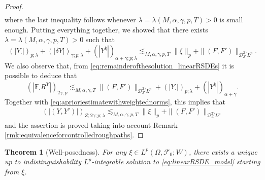 \documentclass[11pt,a4paper]{article}
\newcommand{\E}{\mathbb{E}}
\theoremstyle{plain}
\newtheorem{thm}[defn]{Theorem}
\begin{document}
\begin{proof}
\begin{equation}
\begin{aligned}
       \end{aligned}
   \end{equation}    where the last inequality follows whenever $\lambda=\lambda(M,\alpha,\gamma,p,T)>0$ is small enough.
   Putting everything together, we showed that there exists $\lambda=\lambda(M,\alpha,\gamma,p,T)>0$ such that \begin{equation} \label{eq:aprioriestimatewithweightednorms}
       (|Y_\cdot|)_{p;\lambda} + (|\delta{Y}|)_{\gamma;p;\lambda} + (|Y^\natural|)_{\alpha+\gamma;p;\lambda} \lesssim_{M,\alpha,\gamma,p,T} \|\xi\|_p + \|(F,F')\|_{\mathscr{D}^{2\gamma}_ZL^{p}}.
   \end{equation}
   We also observe that, from \eqref{eq:remainderofthesolution_linearRSDEs} it is possible to deduce that \begin{equation} \label{eq:weightednormoftheremainderofY}
       (|\E_\cdot R^Y|)_{2\gamma;p} \lesssim_{M,\alpha,\gamma,T} \|(F,F')\|_{\mathscr{D}_Z^{2\gamma}L^p} + (|Y_\cdot|)_{p;\lambda} + (|Y^\natural|)_{\alpha+\gamma}.
   \end{equation}
   Together with \eqref{eq:aprioriestimatewithweightednorms}, this implies that \begin{equation*}
       \begin{aligned}
           (|(Y,Y')|)_{Z;2\gamma;p;\lambda} \lesssim_{M,\alpha,\gamma,p,T} \|\xi\|_p + \|(F,F')\|_{\mathscr{D}^{2\gamma}_ZL^{p}}
       \end{aligned}
   \end{equation*} 
   and the assertion is proved taking into account Remark \ref{rmk:equivalenceforcontrolledroughpaths}.
\end{proof}


\begin{thm}[Well-posedness] \label{thm:wellposednesslinearRSDEs} For any $\xi \in L^p(\Omega,\mathcal{F}_0;W)$, there exists a unique up to indistinguishability $L^p$-integrable solution to \eqref{eq:linearRSDE_model} starting from $\xi$.
\end{thm}
\end{document}
